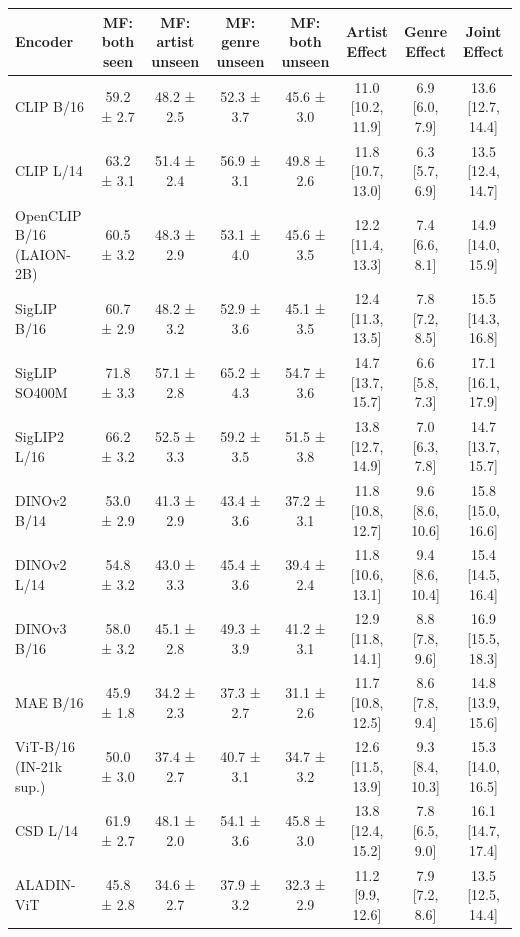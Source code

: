 \begin{tabular}{lccccccc}
\toprule
Encoder & MF: both seen & MF: artist unseen & MF: genre unseen & MF: both unseen & Artist Effect & Genre Effect & Joint Effect \\
\midrule
CLIP B/16 & 59.2 ± 2.7 & 48.2 ± 2.5 & 52.3 ± 3.7 & 45.6 ± 3.0 & 11.0 [10.2, 11.9] & 6.9 [6.0, 7.9] & 13.6 [12.7, 14.4] \\
CLIP L/14 & 63.2 ± 3.1 & 51.4 ± 2.4 & 56.9 ± 3.1 & 49.8 ± 2.6 & 11.8 [10.7, 13.0] & 6.3 [5.7, 6.9] & 13.5 [12.4, 14.7] \\
OpenCLIP B/16 (LAION-2B) & 60.5 ± 3.2 & 48.3 ± 2.9 & 53.1 ± 4.0 & 45.6 ± 3.5 & 12.2 [11.4, 13.3] & 7.4 [6.6, 8.1] & 14.9 [14.0, 15.9] \\
SigLIP B/16 & 60.7 ± 2.9 & 48.2 ± 3.2 & 52.9 ± 3.6 & 45.1 ± 3.5 & 12.4 [11.3, 13.5] & 7.8 [7.2, 8.5] & 15.5 [14.3, 16.8] \\
SigLIP SO400M & 71.8 ± 3.3 & 57.1 ± 2.8 & 65.2 ± 4.3 & 54.7 ± 3.6 & 14.7 [13.7, 15.7] & 6.6 [5.8, 7.3] & 17.1 [16.1, 17.9] \\
SigLIP2 L/16 & 66.2 ± 3.2 & 52.5 ± 3.3 & 59.2 ± 3.5 & 51.5 ± 3.8 & 13.8 [12.7, 14.9] & 7.0 [6.3, 7.8] & 14.7 [13.7, 15.7] \\
DINOv2 B/14 & 53.0 ± 2.9 & 41.3 ± 2.9 & 43.4 ± 3.6 & 37.2 ± 3.1 & 11.8 [10.8, 12.7] & 9.6 [8.6, 10.6] & 15.8 [15.0, 16.6] \\
DINOv2 L/14 & 54.8 ± 3.2 & 43.0 ± 3.3 & 45.4 ± 3.6 & 39.4 ± 2.4 & 11.8 [10.6, 13.1] & 9.4 [8.6, 10.4] & 15.4 [14.5, 16.4] \\
DINOv3 B/16 & 58.0 ± 3.2 & 45.1 ± 2.8 & 49.3 ± 3.9 & 41.2 ± 3.1 & 12.9 [11.8, 14.1] & 8.8 [7.8, 9.6] & 16.9 [15.5, 18.3] \\
MAE B/16 & 45.9 ± 1.8 & 34.2 ± 2.3 & 37.3 ± 2.7 & 31.1 ± 2.6 & 11.7 [10.8, 12.5] & 8.6 [7.8, 9.4] & 14.8 [13.9, 15.6] \\
ViT-B/16 (IN-21k sup.) & 50.0 ± 3.0 & 37.4 ± 2.7 & 40.7 ± 3.1 & 34.7 ± 3.2 & 12.6 [11.5, 13.9] & 9.3 [8.4, 10.3] & 15.3 [14.0, 16.5] \\
CSD L/14 & 61.9 ± 2.7 & 48.1 ± 2.0 & 54.1 ± 3.6 & 45.8 ± 3.0 & 13.8 [12.4, 15.2] & 7.8 [6.5, 9.0] & 16.1 [14.7, 17.4] \\
ALADIN-ViT & 45.8 ± 2.8 & 34.6 ± 2.7 & 37.9 ± 3.2 & 32.3 ± 2.9 & 11.2 [9.9, 12.6] & 7.9 [7.2, 8.6] & 13.5 [12.5, 14.4] \\
\bottomrule
\end{tabular}
